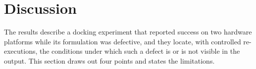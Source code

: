 \documentclass{iopjournal}
\begin{document}
\section{Discussion}
\label{sec:discussion}

The results describe a docking experiment that reported success on two hardware platforms while its formulation was defective, and they locate, with controlled re-executions, the conditions under which such a defect is or is not visible in the output. This section draws out four points and states the limitations.
\end{document}
